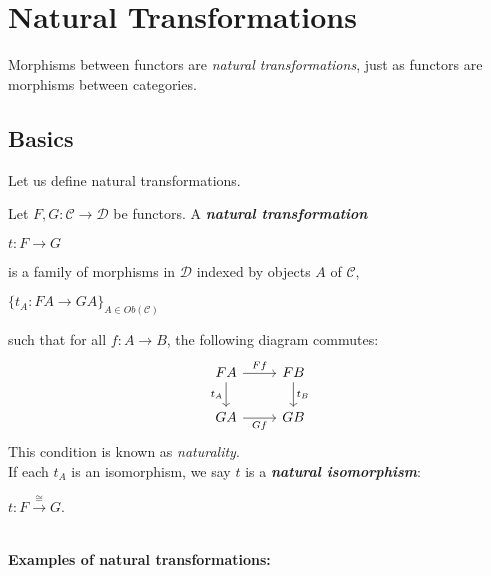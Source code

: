 \documentclass[]{amsbook}
\newcommand{\0}{\mathbf{0}}
\newcommand{\1}{\mathbf{1}}
\newcommand{\mc}[1]{\mathcal{#1}}
\begin{document}
\section{Natural Transformations}
Morphisms between functors are \emph{natural transformations}, just as functors
are morphisms between categories.

\subsection*{Basics}
Let us define natural transformations.

Let $F, G: \mc{C} \to \mc{D}$ be functors. A \emph{\textbf{natural
transformation}}
\begin{center}
    $t: F \to G$
\end{center}
is a family of morphisms in $\mc{D}$ indexed by objects $A$ of $\mc{C}$,
\begin{center}
    $\{ t_A : FA \to GA \}_{A \in Ob(\mc{C})}$
\end{center}
such that for all $f: A \to B$, the following diagram commutes:
\[
\begin{tikzcd}
    FA \arrow[r, "Ff"]
       \arrow[d, swap, "t_A"]
       & FB \arrow[d, "t_B"]\\
    GA \arrow[r, swap, "Gf"]
       & GB
\end{tikzcd}
\]
This condition is known as \emph{naturality}.\\
If each $t_A$ is an isomorphism, we say $t$ is a \emph{\textbf{natural
isomorphism}}:
\begin{center}
    $t: F \xrightarrow{\cong} G$.
\end{center}
~\\
\textbf{Examples of natural transformations:}
\end{document}
